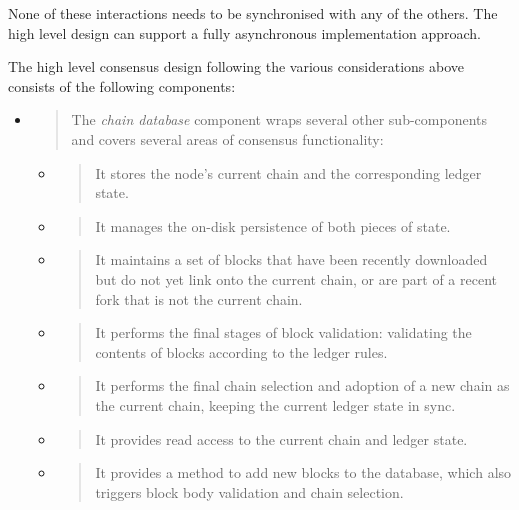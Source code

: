 \documentclass[11pt,a4paper]{article}
\begin{document}
None of these interactions needs to be synchronised with any of the
others. The high level design can support a fully asynchronous
implementation approach.

The high level consensus design following the various considerations
above consists of the following components:

\begin{itemize}
\item
  \begin{quote}
  The \emph{chain database} component wraps several other sub-components
  and covers several areas of consensus functionality:
  \end{quote}

  \begin{itemize}
  \item
    \begin{quote}
    It stores the node's current chain and the corresponding ledger
    state.
    \end{quote}
  \item
    \begin{quote}
    It manages the on-disk persistence of both pieces of state.
    \end{quote}
  \item
    \begin{quote}
    It maintains a set of blocks that have been recently downloaded but
    do not yet link onto the current chain, or are part of a recent fork
    that is not the current chain.
    \end{quote}
  \item
    \begin{quote}
    It performs the final stages of block validation: validating the
    contents of blocks according to the ledger rules.
    \end{quote}
  \item
    \begin{quote}
    It performs the final chain selection and adoption of a new chain as
    the current chain, keeping the current ledger state in sync.
    \end{quote}
  \item
    \begin{quote}
    It provides read access to the current chain and ledger state.
    \end{quote}
  \item
    \begin{quote}
    It provides a method to add new blocks to the database, which also
    triggers block body validation and chain selection.

\end{quote}
\end{itemize}
\end{itemize}
\end{document}
